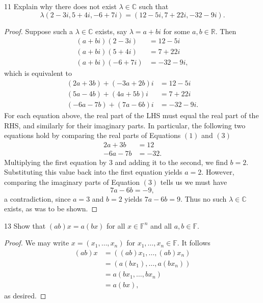 \documentclass{extarticle}
\newenvironment{problem}[1]{\begin{prob*}{#1}{}}{\end{prob*}}
\newcommand{\R}{\mathbb{R}}
\newcommand{\C}{\mathbb{C}}
\newcommand{\F}{\mathbb{F}}
\begin{document}
\begin{problem}{11}
Explain why  there does not exist $\lambda\in\C$ such that
\begin{equation*}
\lambda(2-3i, 5 + 4i, -6 + 7i) = (12 - 5i, 7 + 22i, -32 - 9i).
\end{equation*}
\end{problem}
\begin{proof}
Suppose such a $\lambda\in\C$ exists, say $\lambda = a +bi$ for some $a,b\in\R$.  Then
\begin{align*}
(a+bi)(2-3i) &= 12-5i\\
(a+bi)(5+4i) &= 7 + 22i\\
(a+bi)(-6+7i) &= -32-9i,
\end{align*}
which is equivalent to
\begin{align}
(2a+3b) + (-3a+2b)i &= 12-5i \\
(5a-4b) + (4a+5b)i &= 7 + 22i\\
(-6a-7b) + (7a-6b)i &= -32-9i.
\end{align}
For each equation above, the real part of the LHS must equal the real part of the RHS, and similarly for their imaginary parts.  In particular, the following two equations hold by comparing the real parts of Equations $(1)$ and $(3)$
\begin{align*}
2a+3b &= 12\\
-6a-7b &= -32.
\end{align*}
Multiplying the first equation by $3$ and adding it to the second, we find $b=2$.  Substituting this value back into the first equation yields $a=2$.  However, comparing the imaginary parts of Equation $(3)$ tells us we must have
\begin{equation*}
7a-6b = -9,
\end{equation*}
a contradiction, since $a=3$ and $b=2$ yields $7a-6b = 9$.  Thus no such $\lambda\in\C$ exists, as was to be shown.
\end{proof}

\begin{problem}{13}
Show that $(ab)x = a(bx)$ for all $x\in\F^n$ and all $a,b\in\F$.
\end{problem}
\begin{proof}
We may write $x = (x_1, \dots, x_n)$ for $x_1,\dots,x_n\in\F$.  It follows
\begin{align*}
(ab)x &= \left((ab)x_1,\dots,(ab)x_n\right)\\
&= \left(a(bx_1),\dots,a(bx_n)\right)\\
&= a\left(bx_1,\dots,bx_n\right)\\
&= a(bx),
\end{align*}
as desired.
\end{proof}
\end{document}
